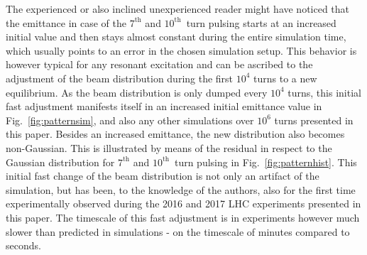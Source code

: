 \documentclass[%
 reprint,
 amsmath,amssymb,
 aps,
prstab,
]{revtex4-1}
\begin{document}
The experienced or also inclined unexperienced reader might have noticed that the emittance in case of the $7^{\mathrm{th}}$ and $10^{\mathrm{th}}$~turn pulsing starts at an increased initial value and then stays almost constant during the entire simulation time, which usually points to an error in the chosen simulation setup. This behavior is however typical for any resonant excitation and can be ascribed to the adjustment of the beam distribution during the first $10^4$ turns to a new equilibrium. As the beam distribution is only dumped every $10^4$ turns, this initial fast adjustment manifests itself in an increased initial emittance value in Fig.~\ref{fig:patternsim}, and also any other simulations over $10^6$ turns presented in this paper. Besides an increased emittance, the new distribution also becomes non-Gaussian. This is illustrated by means of the residual in respect to the Gaussian distribution for $7^{\mathrm{th}}$ and $10^{\mathrm{th}}$~turn pulsing in Fig.~\ref{fig:patternhist}. This initial fast change of the beam distribution is not only an artifact of the simulation, but has been, to the knowledge of the authors, also for the first time experimentally observed during the 2016 and 2017 LHC experiments presented in this paper. The timescale of this fast adjustment is in experiments however much slower than predicted in simulations - on the timescale of minutes compared to seconds. 
\end{document}
